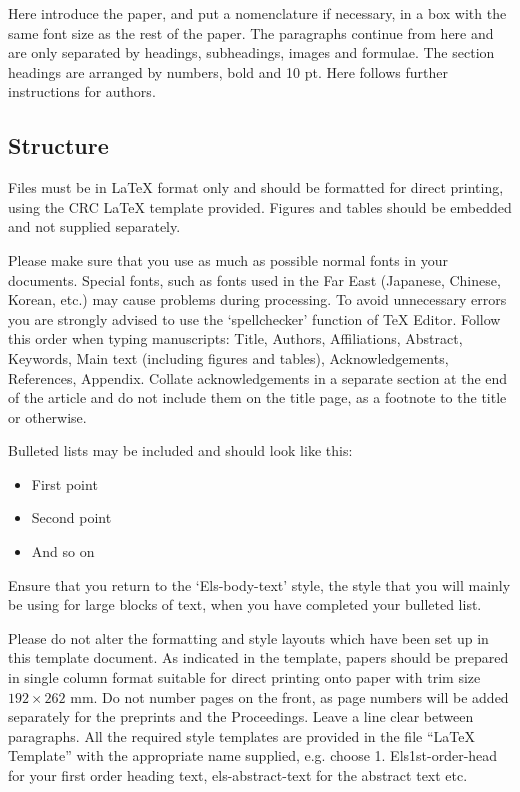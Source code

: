 \documentclass[5p,times,procedia]{elsarticle}
\begin{document}
Here introduce the paper, and put a nomenclature if necessary, in a box with the same font size as the rest of the paper. The paragraphs continue from here and are only separated by headings, subheadings, images and formulae. The section headings are arranged by numbers, bold and 10 pt. Here follows further instructions for authors.

\vspace*{8pt}
\begin{nomenclature}
\begin{deflist}[A]
\end{deflist}
\end{nomenclature}\vskip24pt

\subsection{ Structure}
Files must be in LaTeX format only and should be formatted for direct printing, using the CRC LaTeX template provided. Figures and tables should be embedded and not supplied separately. 

Please make sure that you use as much as possible normal fonts in your documents. Special fonts, such as fonts used in\vadjust{\vfill\pagebreak} the Far East (Japanese, Chinese, Korean, etc.) may cause problems during processing. To avoid unnecessary errors you are strongly advised to use the `spellchecker' function of TeX Editor. Follow this order when typing manuscripts: Title, Authors, Affiliations, Abstract, Keywords, Main text (including figures and tables), Acknowledgements, References, Appendix. Collate acknowledgements in a separate section at the end of the article and do not include them on the title page, as a footnote to the title or otherwise.

Bulleted lists may be included and should look like this:
\begin{itemize}[]
\item First point
\item Second point
\item And so on
\end{itemize}

Ensure that you return to the `Els-body-text' style, the style that you will mainly be using for large blocks of text, when you have completed your bulleted list. 

Please do not alter the formatting and style layouts which have been set up in this template document. As indicated in the template, papers should be prepared in single column format suitable for direct printing onto paper with trim size $192 \times 262$ mm. Do not number pages on the front, as page numbers will be added separately for the preprints and the Proceedings. Leave a line clear between paragraphs. All the required style templates are provided in the file ``LaTeX Template'' with the appropriate name supplied, e.g. choose 1. Els1st-order-head for your first order heading text, els-abstract-text for the abstract text etc.
\end{document}
